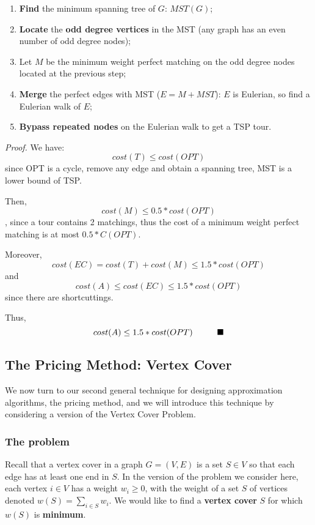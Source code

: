 \begin{enumerate}
    \item \textbf{Find} the minimum spanning tree of $G$: $MST(G)$;
    \item \textbf{Locate} the \textbf{odd degree vertices} in the MST (any graph has an even number of odd degree nodes);


    \item Let $M$ be the minimum weight perfect matching on the odd degree nodes located at the previous step;
    

    \item \textbf{Merge} the perfect edges with MST ($E=M+MST$): $E$ is Eulerian, so find a Eulerian walk of $E$;


    \item \textbf{Bypass repeated nodes} on the Eulerian walk to get a TSP tour.
    
\end{enumerate}


\textit{Proof.} We have:
$$cost(T) \leq cost(OPT)$$ since OPT is a cycle, remove any edge and obtain a spanning tree, MST is a lower bound of TSP.

Then,
$$cost(M) \leq 0.5 * cost(OPT)$$, since a tour contains 2 matchings, thus the cost of a minimum weight perfect matching is at most
$0.5 * C(OPT)$.

Moreover, $$cost(EC) = cost(T) + cost(M) \leq 1.5 * cost (OPT)$$ and $$cost(A) \leq cost(EC) \leq 1.5 * cost(OPT)$$ since there are shortcuttings.

Thus, $$cost(A) \leq 1.5 * cost(OPT) \hspace{10mm} \blacksquare$$

\subsection{The Pricing Method: Vertex Cover}
We now turn to our second general technique for designing approximation algorithms, the pricing method, and we will introduce this technique by considering a version of the Vertex Cover Problem. 

\subsubsection{The problem}
Recall that a vertex cover in a graph $G = (V, E)$ is a set $S \in V$ so that each edge has at least one end in $S$. In the version of the problem we consider here, each vertex $i \in V$ has a weight $w_i \geq 0$, with the weight of a set $S$ of vertices denoted $w(S) = \sum_{i \in S} w_i$. We would like to find a \textbf{vertex cover} $S$ for which $w(S)$ is \textbf{minimum}. 

